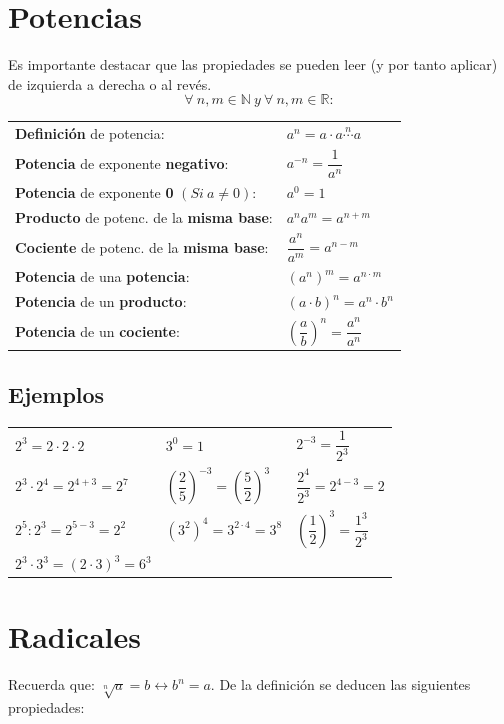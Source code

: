 \documentclass[a4paper,spanish,9pt]{extarticle}
\begin{document}
\begin{multicols*}{2}


\section{Potencias}

Es importante destacar que las propiedades se pueden leer (y por tanto aplicar) de izquierda a derecha o al revés.
$$\forall \ n,m \in \mathbb{N} \ y \ \forall \  n,m \in \mathbb{R}:$$
\begin{tabular}{ll}
\textbf{Definición} de potencia: & $a^n = a \cdot a \stackrel{n}{\cdots} a$ \\
\textbf{Potencia} de exponente \textbf{negativo}: & $a^{-n} = \dfrac{1}{a^n}$ \\
\textbf{Potencia} de exponente \textbf{0} $\left( Si \ a \neq 0\right)$: & $a^{0} = 1$ \\
\textbf{Producto} de potenc. de la \textbf{misma base}: & $a^n a^m = a^{n+m}$ \\
\textbf{Cociente} de potenc. de la \textbf{misma base}: & $\dfrac{a^n}{a^m}  = a^{n-m}$ \\
\textbf{Potencia} de una \textbf{potencia}: & $\left(a^n\right)^m  = a^{n \cdot m}$ \\
\textbf{Potencia} de un \textbf{producto}: & $\left(a \cdot b \right)^n = a^n \cdot b^n$ \\
\textbf{Potencia} de un \textbf{cociente}: & $\left(\dfrac{a}{b} \right)^n = \dfrac{a^n}{a^n}$
\end{tabular}

\subsection{Ejemplos}

\begin{tabular}{lll}
$2^3=2\cdot2\cdot2$ & $3^0=1$ & $2^{-3}=\dfrac{1}{2^3}$\\
$2^3 \cdot 2^4 = 2^{4+3} = 2^{7}$ & $\left(\dfrac{2}{5}\right)^{-3}=\left(\dfrac{5}{2}\right)^{3}$ & $\dfrac{2^4}{2^3} = 2^{4-3} = 2$\\
$2^5:2^3 = 2^{5-3} = 2^2$ & $\left(3^2\right)^4  = 3^{2 \cdot 4}=3^{8}$ & $\left(\dfrac{1}{2} \right)^3 = \dfrac{1^3}{2^3}$\\
$2^3 \cdot 3^3=\left(2 \cdot 3 \right)^3 = 6^3$
\end{tabular}

\section{Radicales}
Recuerda que: $\sqrt[n]{a}=b \longleftrightarrow b^n=a$. De la definición se deducen las siguientes propiedades:
\vspace{0.3cm}


\end{multicols*}
\end{document}
